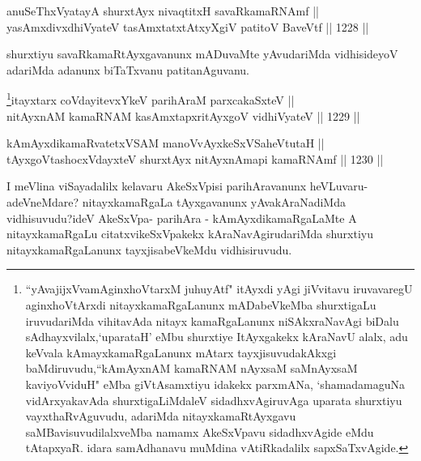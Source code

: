 
\begin{shl}
anuSeThxVyatayA shurxtAyx nivaqtitxH savaRkamaRNAmf || \\
yasAmxdivxdhiVyateV tasAmxtatxtAtxyXgiV patitoV BaveVtf \hfill || 1228 ||  
\end{shl}

\begin{artha}
shurxtiyu savaRkamaRtAyxgavanunx mADuvaMte yAvudariMda vidhisideyoV adariMda adanunx biTaTxvanu patitanAguvanu.
\end{artha}




\begin{shl}
\footnote{``yAvajijxVvamAginxhoVtarxM juhuyAtf" itAyxdi yAgi jiVvitavu iruvavaregU aginxhoVtArxdi nitayxkamaRgaLanunx mADabeVkeMba shurxtigaLu iruvudariMda vihitavAda nitayx kamaRgaLanunx niSAkxraNavAgi biDalu sAdhayxvilalx,`uparataH' eMbu shurxtiye ItAyxgakekx kAraNavU alalx, adu keVvala kAmayxkamaRgaLanunx mAtarx tayxjisuvudakAkxgi baMdiruvudu,``kAmAyxnAM kamaRNAM nAyxsaM saMnAyxsaM kaviyoVviduH" eMba giVtAsamxtiyu idakekx parxmANa, `shamadamaguNa vidArxyakavAda shurxtigaLiMdaleV sidadhxvAgiruvAga uparata shurxtiyu vayxthaRvAguvudu, adariMda nitayxkamaRtAyxgavu saMBavisuvudilalxveMba namamx AkeSxVpavu sidadhxvAgide eMdu tAtapxyaR. idara samAdhanavu muMdina vAtiRkadalilx sapxSaTxvAgide.}itayxtarx coVdayitevxYkeV parihAraM parxcakaSxteV || \\
nitAyxnAM kamaRNAM kasAmxtapxritAyxgoV vidhiVyateV \hfill || 1229 ||  
\end{shl}
				
\begin{shl}
kAmAyxdikamaRvatetxVSAM manoVvAyxkeSxVSaheVtutaH || \\
tAyxgoV\s tashocxVdayxteV shurxtAyx nitAyxnAmapi kamaRNAmf \hfill || 1230 ||  
\end{shl}

\begin{artha}
I meVlina viSayadalilx kelavaru AkeSxVpisi parihAravanunx heVLuvaru-adeVneMdare? nitayxkamaRgaLa tAyxgavanunx yAvakAraNadiMda vidhisuvudu?ideV AkeSxVpa- parihAra - kAmAyxdikamaRgaLaMte A nitayxkamaRgaLu citatxvikeSxVpakekx kAraNavAgirudariMda shurxtiyu nitayxkamaRgaLanunx tayxjisabeVkeMdu vidhisiruvudu.
\end{artha}

